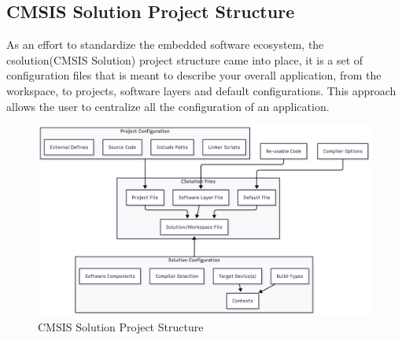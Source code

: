 \subsection{CMSIS Solution Project Structure}
As an effort to standardize the embedded software ecosystem, the csolution(CMSIS Solution) project structure came into place, it is a set of configuration files that is meant to describe your overall application, from the workspace, to projects, software layers and default configurations.
This approach allows the user to centralize all the configuration of an application.
\begin{figure}[H]
	\centering
	\includegraphics[width=15cm]{./img/ST_Summer_Internship/csolution_project_structure.png}
	\caption{CMSIS Solution Project Structure}
	\label{fig:csln_files}
\end{figure}  
